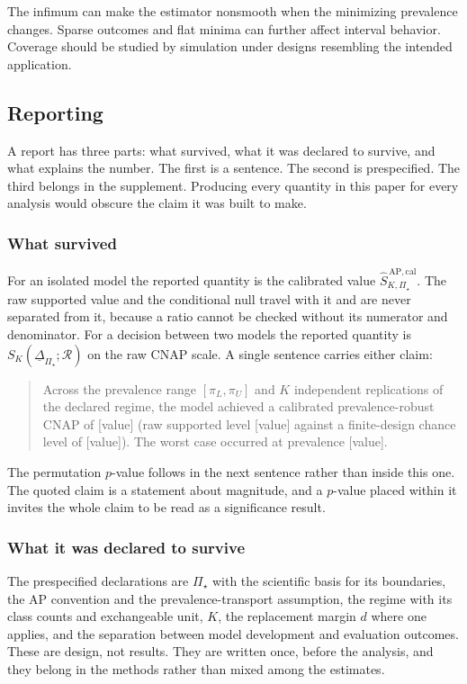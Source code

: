 \documentclass[11pt]{article}
\newcommand{\Regime}{\mathcal{R}}
\newcommand{\PSet}{\Pi_\star}
\newcommand{\RobDelta}{\underline{\Delta}_{\PSet}}
\newcommand{\SRobCalHat}{\widehat S_{K,\PSet}^{\,\mathrm{AP,cal}}}
\theoremstyle{remark}
\begin{document}
The infimum can make the estimator nonsmooth when the minimizing prevalence changes. Sparse outcomes and flat minima can further affect interval behavior. Coverage should be studied by simulation under designs resembling the intended application.

\subsection{Reporting}

A report has three parts: what survived, what it was declared to survive, and what explains the number. The first is a sentence. The second is prespecified. The third belongs in the supplement. Producing every quantity in this paper for every analysis would obscure the claim it was built to make.

\subsubsection*{What survived}

For an isolated model the reported quantity is the calibrated value $\SRobCalHat$. The raw supported value and the conditional null travel with it and are never separated from it, because a ratio cannot be checked without its numerator and denominator. For a decision between two models the reported quantity is $S_K(\RobDelta;\Regime)$ on the raw CNAP scale. A single sentence carries either claim:

\begin{quote}
Across the prevalence range $[\pi_L,\pi_U]$ and $K$ independent replications of the declared regime, the model achieved a calibrated prevalence-robust CNAP of [value] (raw supported level [value] against a finite-design chance level of [value]). The worst case occurred at prevalence [value].
\end{quote}

The permutation $p$-value follows in the next sentence rather than inside this one. The quoted claim is a statement about magnitude, and a $p$-value placed within it invites the whole claim to be read as a significance result.

\subsubsection*{What it was declared to survive}

The prespecified declarations are $\PSet$ with the scientific basis for its boundaries, the AP convention and the prevalence-transport assumption, the regime with its class counts and exchangeable unit, $K$, the replacement margin $d$ where one applies, and the separation between model development and evaluation outcomes. These are design, not results. They are written once, before the analysis, and they belong in the methods rather than mixed among the estimates.
\end{document}
